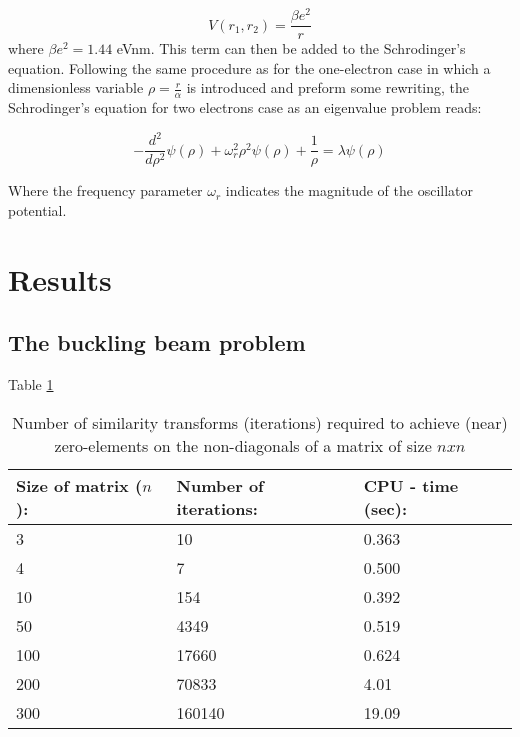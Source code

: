 \documentclass{article}
\begin{document}
\begin{equation}
V(r_1,r_2) = \frac{\beta e^2}{r}
\end{equation}
where $ \beta e^2 = 1.44$ eVnm.
This term can then be added to the Schrodinger's equation. Following the same procedure as for the one-electron case in which a dimensionless variable $\rho = \frac{r}{\alpha}$ is introduced and preform some rewriting, the Schrodinger's equation for two electrons case as an eigenvalue problem reads:

\begin{equation}
    -\frac{d^2}{d\rho^2}\psi(\rho) + \omega_{r}^2\rho^2\psi(\rho) + \frac{1}{\rho} = \lambda\psi(\rho)
\end{equation}

Where the frequency parameter $\omega_r{}$ indicates the magnitude of the oscillator potential. 



\medskip 




\section{Results}\label{sec:res}

\subsection{The buckling beam problem}\label{sec:bbp}

Table \ref{tab:1}

\begin{table}[]
\begin{tabular}{lll}
\textbf{Size of matrix ($n$):} & \textbf{Number of iterations:} & \textbf{CPU - time (sec):} \\ \hline
3                             & 10                            & 0.363                     \\
4                             & 7                             & 0.500                     \\
10                            & 154                           & 0.392                     \\
50                            & 4349                          & 0.519                     \\
100                           & 17660                         & 0.624                     \\
200                           & 70833                         & 4.01                      \\
300                           & 160140                        & 19.09                    
\end{tabular}
\label{tab:1}
\caption{Number of similarity transforms (iterations) required to achieve (near) zero-elements on the non-diagonals of a matrix of size $nxn$}
\end{table}
\end{document}
